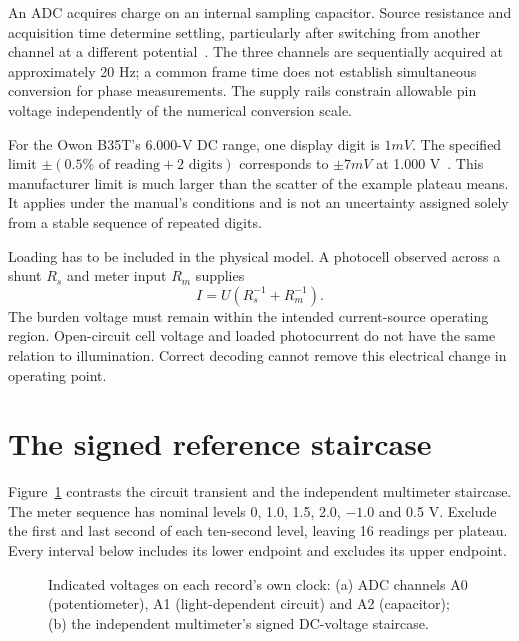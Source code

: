 An ADC acquires charge on an internal sampling capacitor. Source resistance and acquisition time determine settling, particularly after switching from another channel at a different potential~\cite{nrf52840}. The three channels are sequentially acquired at approximately 20 Hz; a common frame time does not establish simultaneous conversion for phase measurements. The supply rails constrain allowable pin voltage independently of the numerical conversion scale.

For the Owon B35T's 6.000-V DC range, one display digit is $1\unit{mV}$. The specified limit $\pm(0.5\%\text{ of reading}+2\text{ digits})$ corresponds to $\pm7\unit{mV}$ at 1.000 V~\cite{owon35}. This manufacturer limit is much larger than the scatter of the example plateau means. It applies under the manual's conditions and is not an uncertainty assigned solely from a stable sequence of repeated digits.

Loading has to be included in the physical model. A photocell observed across a shunt $R_s$ and meter input $R_m$ supplies
\begin{equation}
 I=U(R_s^{-1}+R_m^{-1}).
 \label{eq:analog-inputs-shunt}
\end{equation}
The burden voltage must remain within the intended current-source operating region. Open-circuit cell voltage and loaded photocurrent do not have the same relation to illumination. Correct decoding cannot remove this electrical change in operating point.

\section{The signed reference staircase}
Figure~\ref{fig:analog-inputs-records} contrasts the circuit transient and the independent multimeter staircase. The meter sequence has nominal levels 0, 1.0, 1.5, 2.0, $-1.0$ and 0.5 V. Exclude the first and last second of each ten-second level, leaving 16 readings per plateau. Every interval below includes its lower endpoint and excludes its upper endpoint.

\begin{figure}[t]
\centering

\caption{Indicated voltages on each record's own clock: (a) ADC channels A0 (potentiometer), A1 (light-dependent circuit) and A2 (capacitor); (b) the independent multimeter's signed DC-voltage staircase.}
\label{fig:analog-inputs-records}
\end{figure}

